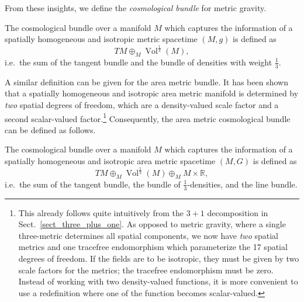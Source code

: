 From these insights, we define the \emph{cosmological bundle} for metric gravity.
\begin{definition}
  The cosmological bundle over a manifold $M$ which captures the information of a spatially homogeneous and isotropic metric spacetime $(M,g)$ is defined as
  \begin{equation}
    TM \oplus_M \operatorname{Vol}^{\frac{1}{3}}(M),
  \end{equation}
  i.e.\ the sum of the tangent bundle and the bundle of densities with weight $\frac{1}{3}$.
\end{definition}
A similar definition can be given for the area metric bundle. It has been shown \cite{Duell_2020} that a spatially homogeneous and isotropic area metric manifold is determined by \emph{two} spatial degrees of freedom, which are a density-valued scale factor and a second scalar-valued factor.\footnote{This already follows quite intuitively from the $3+1$ decomposition in Sect.~\ref{sect_three_plus_one}. As opposed to metric gravity, where a single three-metric determines all spatial components, we now have \emph{two} spatial metrics and one tracefree endomorphism which parameterize the 17 spatial degrees of freedom. If the fields are to be isotropic, they must be given by two scale factors for the metrics; the tracefree endomorphism must be zero. Instead of working with two density-valued functions, it is more convenient to use a redefinition where one of the function becomes scalar-valued.} Consequently, the area metric cosmological bundle can be defined as follows.
\begin{definition}
  The cosmological bundle over a manifold $M$ which captures the information of a spatially homogeneous and isotropic area metric spacetime $(M,G)$ is defined as
  \begin{equation}
    TM \oplus_M \operatorname{Vol}^{\frac{1}{3}}(M) \oplus_M M\times\mathbb R,
  \end{equation}
  i.e.\ the sum of the tangent bundle, the bundle of $\frac{1}{3}$-densities, and the line bundle.
\end{definition}

